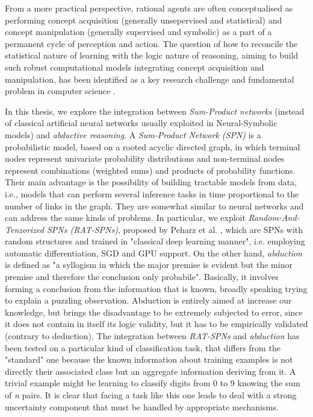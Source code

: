 From a more practical perspective, rational agents are often conceptualised as performing concept acquisition (generally unsepervised and statistical) and concept manipulation (generally supervised and symbolic) as a part of a permanent cycle of perception and action. The question of how to reconcile the statistical nature of learning with the logic nature of reasoning, aiming to build such robust computational models integrating concept acquisition and manipulation, has been identified as a key research challenge and fundamental problem in computer science \cite{10.1145/602382.602410}.

In this thesis, we  explore the integration between \textit{Sum-Product networks} (instead of classical artificial neural networks usually exploited in Neural-Symbolic models) and \textit{abductive reasoning}. A \textit{Sum-Product Network (SPN)} is a probabilistic model, based on a rooted acyclic directed graph, in which terminal nodes represent univariate probability distributions and non-terminal nodes represent combinations (weighted sums) and products of probability functions. Their main advantage is the possibility of building tractable models from data, i.e., models that can perform several inference tasks in time proportional to the number of links in the graph. They are somewhat similar to neural networks and can address the same kinds of problems. In particular, we exploit \textit{Random-And-Tenzorized SPNs (RAT-SPNs)}, proposed by Peharz et al. \cite{DBLP:journals/corr/abs-1806-01910}, which are SPNs with random structures and trained in "classical deep learning manner", i.e. employing automatic differentiation, SGD and GPU support. On the other hand, \textit{abduction} is defined as "a syllogism in which the major premise is evident but the minor premise and therefore the conclusion only probabile". Basically, it involves forming a conclusion from the information that is known, broadly speaking trying to explain a puzzling observation. Abduction is entirely aimed at increase our knowledge, but brings the disadvantage to be extremely subjected to error, since it does not contain in itself its logic validity, but it has to be empirically validated (contrary to deduction). The integration between \textit{RAT-SPNs} and \textit{abduction} has been tested on a particular kind of classification task, that differs from the "standard" one because the known information about training examples is not directly their associated class but an aggregate information deriving from it. A trivial example might be learning to classify digits from 0 to 9 knowing the sum of \textit{n} pairs. It is clear that facing a task like this one leads to deal with a strong uncertainty component that must be handled by appropriate mechanisms.

